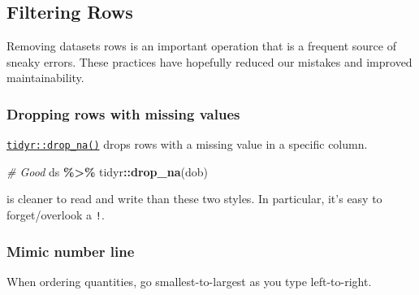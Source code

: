 \documentclass[
]{book}
\newenvironment{Shaded}{\begin{snugshade}}{\end{snugshade}}
\newcommand{\CommentTok}[1]{\textcolor[rgb]{0.56,0.35,0.01}{\textit{#1}}}
\newcommand{\KeywordTok}[1]{\textcolor[rgb]{0.13,0.29,0.53}{\textbf{#1}}}
\newcommand{\NormalTok}[1]{#1}
\newcommand{\OperatorTok}[1]{\textcolor[rgb]{0.81,0.36,0.00}{\textbf{#1}}}
\newcommand{\StringTok}[1]{\textcolor[rgb]{0.31,0.60,0.02}{#1}}
\begin{document}
\hypertarget{style-filter}{%
\subsection{Filtering Rows}\label{style-filter}}

Removing datasets rows is an important operation that is a frequent source of sneaky errors. These practices have hopefully reduced our mistakes and improved maintainability.

\hypertarget{style-filter-drop_na}{%
\subsubsection{Dropping rows with missing values}\label{style-filter-drop_na}}

\href{https://tidyr.tidyverse.org/reference/drop_na.html}{\texttt{tidyr::drop\_na()}} drops rows with a missing value in a specific column.

\begin{Shaded}
\begin{Highlighting}[]
\CommentTok{\# Good}
\NormalTok{ds }\OperatorTok{\%>\%}
\StringTok{  }\NormalTok{tidyr}\OperatorTok{::}\KeywordTok{drop\_na}\NormalTok{(dob)}
\end{Highlighting}
\end{Shaded}

is cleaner to read and write than these two styles. In particular, it's easy to forget/overlook a \texttt{!}.

\begin{Shaded}
\end{Shaded}

\hypertarget{style-filter-number-line}{%
\subsubsection{Mimic number line}\label{style-filter-number-line}}

When ordering quantities, go smallest-to-largest as you type left-to-right.
\end{document}
